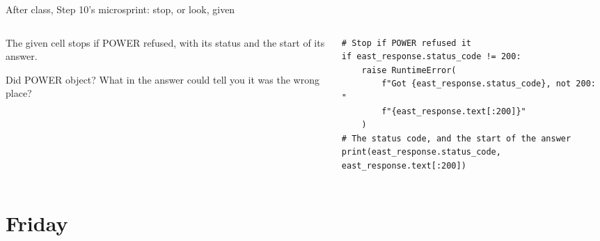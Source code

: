 \documentclass[9pt,aspectratio=169]{beamer}
\begin{document}
\begin{frame}[fragile]{After class, Step 10's microsprint: stop, or look, given}
    \begin{columns}[T]
        \begin{column}{0.37\textwidth}
            The given cell stops if POWER refused, with its status and the start of its answer.

            \medskip
            Did POWER object? What in the answer could tell you it was the wrong place?
        \end{column}
        \begin{column}{0.6\textwidth}
\begin{lstlisting}
# Stop if POWER refused it
if east_response.status_code != 200:
    raise RuntimeError(
        f"Got {east_response.status_code}, not 200: "
        f"{east_response.text[:200]}"
    )
# The status code, and the start of the answer
print(east_response.status_code, east_response.text[:200])
\end{lstlisting}
        \end{column}
    \end{columns}
\end{frame}

\section{Friday}
\end{document}
